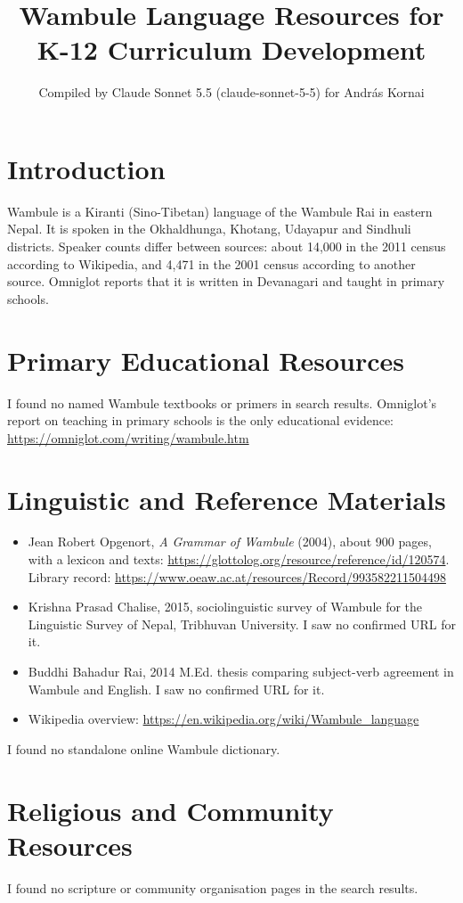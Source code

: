 \documentclass[12pt]{article}
\title{Wambule Language Resources for K-12 Curriculum Development}
\author{Compiled by Claude Sonnet 5.5 (claude-sonnet-5-5) for Andr\'as Kornai}
\date{}
\begin{document}
\maketitle

\section{Introduction}
Wambule is a Kiranti (Sino-Tibetan) language of the Wambule Rai in eastern Nepal. It is spoken in the Okhaldhunga, Khotang, Udayapur and Sindhuli districts. Speaker counts differ between sources: about 14,000 in the 2011 census according to Wikipedia, and 4,471 in the 2001 census according to another source. Omniglot reports that it is written in Devanagari and taught in primary schools.

\section{Primary Educational Resources}
I found no named Wambule textbooks or primers in search results. Omniglot's report on teaching in primary schools is the only educational evidence: \url{https://omniglot.com/writing/wambule.htm}

\section{Linguistic and Reference Materials}
\begin{itemize}
\item Jean Robert Opgenort, \emph{A Grammar of Wambule} (2004), about 900 pages, with a lexicon and texts: \url{https://glottolog.org/resource/reference/id/120574}. Library record: \url{https://www.oeaw.ac.at/resources/Record/993582211504498}
\item Krishna Prasad Chalise, 2015, sociolinguistic survey of Wambule for the Linguistic Survey of Nepal, Tribhuvan University. I saw no confirmed URL for it.
\item Buddhi Bahadur Rai, 2014 M.Ed. thesis comparing subject-verb agreement in Wambule and English. I saw no confirmed URL for it.
\item Wikipedia overview: \url{https://en.wikipedia.org/wiki/Wambule_language}
\end{itemize}
I found no standalone online Wambule dictionary.

\section{Religious and Community Resources}
I found no scripture or community organisation pages in the search results.
\end{document}
